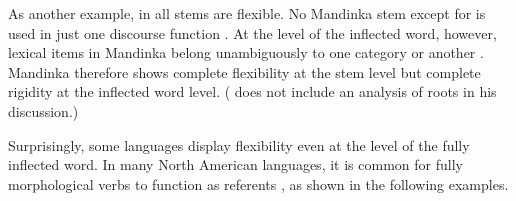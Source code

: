 As another example, in  all stems are flexible. No Mandinka stem except for   is used in just one discourse function \parencite[46]{Creissels2017}. At the level of the inflected word, however, lexical items in Mandinka belong unambiguously to one category or another \parencite[37]{Creissels2017}. Mandinka therefore shows complete flexibility at the stem level but complete rigidity at the inflected word level. (\citeauthor{Creissels2017} does not include an analysis of roots in his discussion.)

Surprisingly, some languages display flexibility even at the level of the fully inflected word. In many North American languages, it is common for fully morphological verbs to function as referents \parencite{Hieberfc}, as shown in the following examples.

